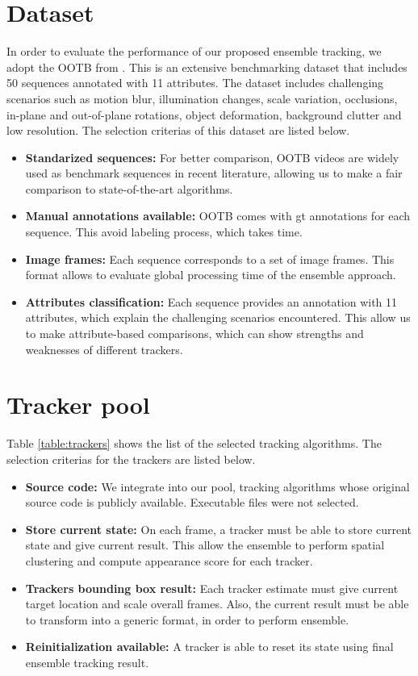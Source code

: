 \section{Dataset}
In order to evaluate the performance of our proposed ensemble tracking,
we adopt the OOTB from \cite{Wu2013B}.
This is an extensive benchmarking dataset that includes 50 sequences
annotated with 11 attributes.
The dataset includes challenging scenarios such as motion blur,
illumination changes, scale variation, occlusions,
in-plane and out-of-plane rotations, object deformation,
background clutter and low resolution. The selection criterias of this dataset
are listed below. 
\begin{itemize}
\item \textbf{Standarized sequences: }For better comparison, OOTB videos are
widely used as benchmark sequences in recent literature, allowing us to make a
fair comparison to state-of-the-art algorithms.
\item \textbf{Manual annotations available: }OOTB comes with \gls{gt} annotations for each sequence. This avoid labeling process, which takes time.
\item \textbf{Image frames: } Each sequence corresponds to a set of image frames. This format allows to evaluate global processing time of the ensemble approach.
\item \textbf{Attributes classification: } Each sequence provides an annotation with 11 attributes, which explain the challenging scenarios encountered. This
allow us to make attribute-based comparisons, which can show strengths and weaknesses of different trackers.

\end{itemize}

\section{Tracker pool}

Table \ref{table:trackers} shows the list of the
selected tracking algorithms. The selection criterias for the trackers are
listed below.
\begin{itemize}
\item \textbf{Source code: } We integrate into our pool, tracking algorithms
whose original source code is publicly available. Executable files were not
selected.
\item \textbf{Store current state: } On each frame, a tracker must be able to
store current state and give current result. This allow the ensemble to
perform spatial clustering and compute appearance score for each tracker.
\item \textbf{Trackers bounding box result: } Each tracker estimate must give
current target location and scale overall frames. Also, the current result
must be able to transform into a generic format, in order to perform ensemble.
\item \textbf{Reinitialization available: } A tracker is able to reset its
state using final ensemble tracking result.
\end{itemize}

